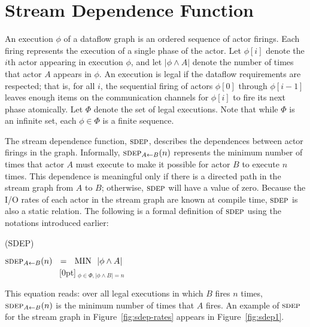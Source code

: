
\section{Stream Dependence Function}

An execution $\phi$ of a dataflow graph is an ordered sequence of
actor firings.  Each firing represents the execution of a single phase
of the actor.  Let $\phi[i]$ denote the $i$th actor appearing in
execution $\phi$, and let $|\phi \wedge A|$ denote the number of times
that actor $A$ appears in $\phi$.  An execution is legal if the
dataflow requirements are respected; that is, for all $i$, the
sequential firing of actors $\phi[0]$ through $\phi[i-1]$ leaves
enough items on the communication channels for $\phi[i]$ to fire its
next phase atomically.  Let $\Phi$ denote the set of legal executions.
Note that while $\Phi$ is an infinite set, each $\phi \in \Phi$ is a
finite sequence.

The stream dependence function, $\textsc{sdep}$, describes the dependences
between actor firings in the graph.  Informally, $\sdepf{A}{B}(n)$
represents the minimum number of times that actor $A$ must execute to
make it possible for actor $B$ to execute $n$ times.  This dependence
is meaningful only if there is a directed path in the stream graph
from $A$ to $B$; otherwise, $\textsc{sdep}$ will have a value of zero.
Because the I/O rates of each actor in the stream graph are known at
compile time, $\textsc{sdep}$ is also a static relation.  The following is a
formal definition of $\textsc{sdep}$ using the notations introduced earlier:
\begin{definition}(SDEP)
\begin{center}
$\sdepf{A}{B}(n)~~ = ~~\mbox{MIN}~~|\phi \wedge A|$ \\
~~~~~~~~~~~~~\raisebox{5pt}[0pt]{$~_{\phi \in \Phi, |\phi \wedge B| = n}$}
\label{eq:sdepdef}
\end{center}
\end{definition}
This equation reads: over all legal executions in which $B$ fires $n$
times, $\sdepf{A}{B}(n)$ is the minimum number of times that $A$
fires.  An example of $\textsc{sdep}$ for the stream graph in
Figure~\ref{fig:sdep-rates} appears in Figure~\ref{fig:sdep1}.

